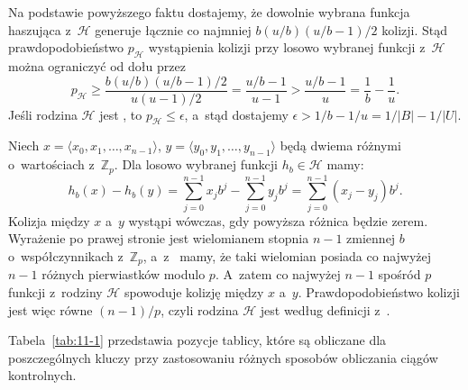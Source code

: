 Na podstawie powyższego faktu dostajemy, że dowolnie wybrana funkcja haszująca z~$\mathcal{H}$ generuje łącznie co najmniej $b(u/b)(u/b-1)/2$ kolizji.
Stąd prawdopodobieństwo $p_{\mathcal{H}}$ wystąpienia kolizji przy losowo wybranej funkcji z~$\mathcal{H}$ można ograniczyć od dołu przez
\[
	p_{\mathcal{H}} \ge \frac{b(u/b)(u/b-1)/2}{u(u-1)/2} = \frac{u/b-1}{u-1} > \frac{u/b-1}{u} = \frac{1}{b}-\frac{1}{u}.
\]
Jeśli rodzina $\mathcal{H}$ jest , to $p_{\mathcal{H}}\le\epsilon$, a~stąd dostajemy $\epsilon>1/b-1/u=1/|B|-1/|U|$.

\exercise %
Niech $x=\langle x_0,x_1,\dots,x_{n-1}\rangle$, $y=\langle y_0,y_1,\dots,y_{n-1}\rangle$ będą dwiema różnymi  o~wartościach z~$\mathbb{Z}_p$.
Dla losowo wybranej funkcji $h_b\in\mathcal{H}$ mamy:
\[
	h_b(x)-h_b(y) = \sum_{j=0}^{n-1}x_jb^j-\sum_{j=0}^{n-1}y_jb^j = \sum_{j=0}^{n-1}(x_j-y_j)b^j.
\]
Kolizja między $x$ a~$y$ wystąpi wówczas, gdy powyższa różnica będzie zerem.
Wyrażenie po prawej stronie jest wielomianem stopnia $n-1$ zmiennej $b$ o~współczynnikach z~$\mathbb{Z}_p$, a~z~ mamy, że taki wielomian posiada co najwyżej $n-1$ różnych pierwiastków modulo $p$.
A~zatem co najwyżej $n-1$ spośród $p$ funkcji z~rodziny $\mathcal{H}$ spowoduje kolizję między $x$ a~$y$.
Prawdopodobieństwo kolizji jest więc równe $(n-1)/p$, czyli rodzina $\mathcal{H}$ jest  według definicji z~.


\exercise %

\noindent Tabela~\ref{tab:11-1} przedstawia pozycje tablicy, które są obliczane dla poszczególnych kluczy przy zastosowaniu różnych sposobów obliczania ciągów kontrolnych.

